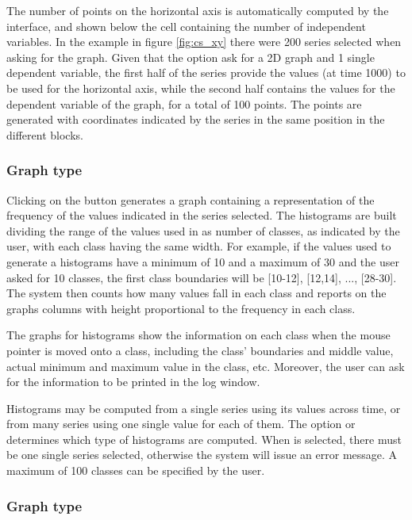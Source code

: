 \documentclass [11pt,a4paper] {book}
\begin{document}
The number of points on the horizontal axis is automatically computed by the interface, and shown below the cell containing the number of independent variables. In the example in figure \ref{fig:cs_xy} there were 200 series selected when asking for the graph. Given that the option ask for a 2D graph and 1 single dependent variable, the first half of the series provide the values (at time 1000) to be used for the horizontal axis, while the second half contains the values for the dependent variable of the graph, for a total of 100 points. The points are generated with coordinates indicated by the series in the same position in the different blocks. 

\subsubsection{Graph type }

Clicking on the button  generates a graph containing a representation of the frequency of the values indicated in the series selected. The histograms are built dividing the range of the values used in as number of classes, as indicated by the user, with each class having the same width. For example, if the values used to generate a histograms have a minimum of 10 and a maximum of 30 and the user asked for 10 classes, the first class boundaries will be [10-12], [12,14], ..., [28-30]. The system then counts how many values fall in each class and reports on the graphs columns with height proportional to the frequency in each class.

The graphs for histograms show the information on each class when the mouse pointer is moved onto a class, including the class' boundaries and middle value, actual minimum and maximum value in the class, etc. Moreover, the user can ask for the information to be printed in the log window.

Histograms may be computed from a single series using its values across time, or from many series using one single value for each of them. The option  or  determines which type of histograms are computed. When  is selected, there must be one single series selected, otherwise the system will issue an error message. A maximum of 100 classes can be specified by the user.


\subsubsection{Graph type }
\end{document}
